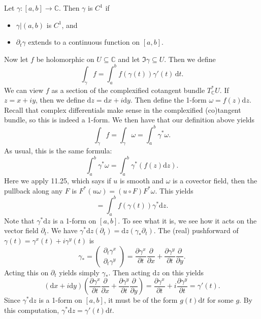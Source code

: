 Let $\gamma : [a,b] \to \mathbb{C} $. Then $\gamma $ is $C^1$ if
\begin{itemize}
	\item $\gamma |(a,b)$ is $C^1$, and
	\item $\partial _t\gamma $ extends to a continuous function on $[a,b]$.
\end{itemize}
Now let $f$ be holomorphic on $U\subseteq \mathbb{C} $ and let $\Im \gamma \subseteq U$. Then we define
\[
	\int_\gamma f = \int_a^b f(\gamma (t))\gamma '(t) \,\mathrm{d} t
.\]
We can view $f$ as a section of the complexified cotangent bundle $T_\mathbb{C} ^*U$. If $z=x+iy$, then we define $\mathrm{d} z=\mathrm{d} x+i\mathrm{d} y$. Then define the 1-form $\omega =f(z)\mathrm{d} z$. Recall that complex differentials make sense in the complexified (co)tangent bundle, so this is indeed a 1-form. We then have that our definition above yields
\[
	\int_\gamma f = \int_\gamma \omega =\int_a^b \gamma ^*\omega 
.\]
As usual, this is the same formula:
\[
	\int_{a}^{b} \gamma ^*\omega =\int_{a}^{b} \gamma ^*(f(z)\mathrm{d} z) 
.\]
Here we apply \cite{lee} 11.25, which says if $u$ is smooth and $\omega $ is a covector field, then the pullback along any $F$ is $F^*(u\omega )=(u\circ F)F^*\omega $. This yields
\[
	=\int_a^b f(\gamma (t)) \gamma ^*\mathrm{d} z
.\]
Note that $\gamma ^*\mathrm{d} z$ is a 1-form on $[a,b]$. To see what it is, we see how it acts on the vector field $\partial _t$. We have $\gamma ^*\mathrm{d} z( \partial _t)=\mathrm{d} z(\gamma _*\partial_t)$. The (real) pushforward of $\gamma (t)=\gamma ^x(t)+i \gamma ^y(t)$ is
\[
	\gamma _* = \begin{pmatrix}
	\partial_t\gamma ^x \\
	\partial _t\gamma ^y
	\end{pmatrix} = \frac{\partial \gamma ^x}{\partial t} \frac{\partial }{\partial x} +\frac{\partial \gamma ^y}{\partial t} \frac{\partial }{\partial y} 
.\]
Acting this on $\partial _t$ yields simply $\gamma _*$. Then acting $\mathrm{d} z$ on this yields
\[
	\left( \mathrm{d} x+i \mathrm{d} y \right) \left( \frac{\partial \gamma ^x}{\partial t} \frac{\partial }{\partial x} +\frac{\partial \gamma ^y}{\partial t} \frac{\partial }{\partial y}  \right) =\frac{\partial \gamma ^x}{\partial t} +i \frac{\partial \gamma ^y}{\partial t} =\gamma '(t)
.\]
Since $\gamma ^*\mathrm{d}z$ is a 1-form on $[a,b]$, it must be of the form $g(t)\mathrm{d} t$ for some $g$. By this computation, $\gamma ^*\mathrm{d} z=\gamma '(t)\mathrm{d} t$.
